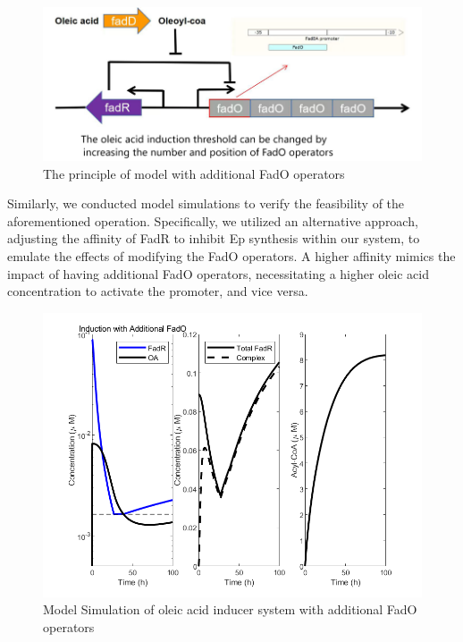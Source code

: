 \documentclass[UTF8]{article}
\begin{document}
\begin{figure}[h]
	\centering
	\includegraphics[width=0.75\linewidth]{figures/fado.png}
	\caption{The principle of model with additional FadO operators}
	\label{fig:fado}
\end{figure}

Similarly, we conducted model simulations to verify the feasibility of  the aforementioned operation. Specifically, we utilized an alternative  approach, adjusting the affinity of FadR to inhibit Ep synthesis within our system, to emulate the effects of modifying the FadO operators. A  higher affinity mimics the impact of having additional FadO operators,  necessitating a higher oleic acid concentration to activate the  promoter, and vice versa.



\begin{figure}[h]
	\centering
	\includegraphics[width=0.75\linewidth]{figures/PAR_fig_fado.png}
	\caption{Model Simulation of oleic acid inducer system with additional FadO operators}
	\label{fig:PAR_fig_fado}
\end{figure}
\end{document}
